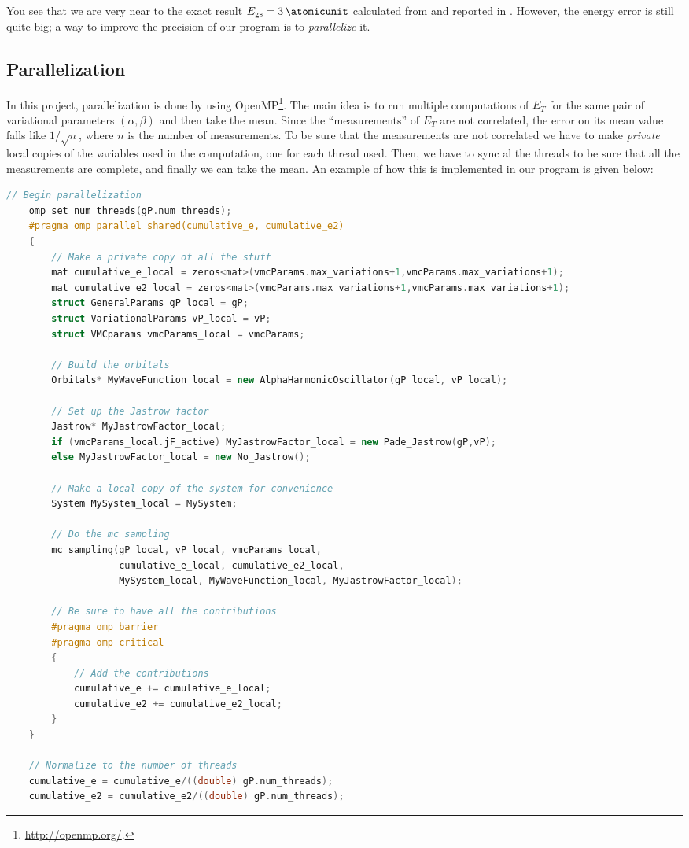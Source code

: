 \documentclass[a4paper,twoside,11pt]{book}
\begin{document}
You see that we are very near to the exact result $E_{\text{gs}} = \SI{3}{\atomicunit}$ calculated from \cite{taut} and reported in \cite{PedersenLohne2011}. However, the energy error is still quite big; a way to improve the precision of our program is to \emph{parallelize} it.

\subsection{Parallelization}

In this project, parallelization is done by using OpenMP\footnote{\url{http://openmp.org/}.}. The main idea is to run multiple computations of $E_T$ for the same pair of variational parameters $(\alpha,\beta)$ and then take the mean. Since the ``measurements'' of $E_T$ are not correlated, the error on its mean value falls like $1/\sqrt{n}$, where $n$ is the number of measurements. To be sure that the measurements are not correlated we have to make \emph{private} local copies of the variables used in the computation, one for each thread used. Then, we have to sync al the threads to be sure that all the measurements are complete, and finally we can take the mean. An example of how this is implemented in our program is given below:

\begin{lstlisting}[language=cpp]
    // Begin parallelization
    omp_set_num_threads(gP.num_threads);
    #pragma omp parallel shared(cumulative_e, cumulative_e2)
    {
        // Make a private copy of all the stuff
        mat cumulative_e_local = zeros<mat>(vmcParams.max_variations+1,vmcParams.max_variations+1);
        mat cumulative_e2_local = zeros<mat>(vmcParams.max_variations+1,vmcParams.max_variations+1);
        struct GeneralParams gP_local = gP;
        struct VariationalParams vP_local = vP;
        struct VMCparams vmcParams_local = vmcParams;

        // Build the orbitals
        Orbitals* MyWaveFunction_local = new AlphaHarmonicOscillator(gP_local, vP_local);

        // Set up the Jastrow factor
        Jastrow* MyJastrowFactor_local;
        if (vmcParams_local.jF_active) MyJastrowFactor_local = new Pade_Jastrow(gP,vP);
        else MyJastrowFactor_local = new No_Jastrow();

        // Make a local copy of the system for convenience
        System MySystem_local = MySystem;

        // Do the mc sampling
        mc_sampling(gP_local, vP_local, vmcParams_local,
                    cumulative_e_local, cumulative_e2_local,
                    MySystem_local, MyWaveFunction_local, MyJastrowFactor_local);

        // Be sure to have all the contributions
        #pragma omp barrier
        #pragma omp critical
        {
            // Add the contributions
            cumulative_e += cumulative_e_local;
            cumulative_e2 += cumulative_e2_local;
        }
    }

    // Normalize to the number of threads
    cumulative_e = cumulative_e/((double) gP.num_threads);
    cumulative_e2 = cumulative_e2/((double) gP.num_threads);
\end{lstlisting}
\end{document}
